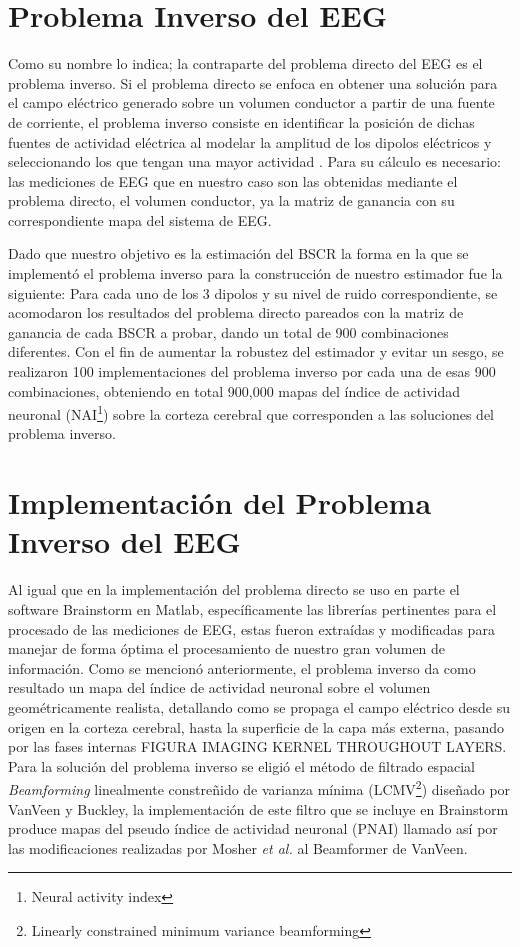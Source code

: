 \section{Problema Inverso del EEG}
\label{sec:system:inverse}

Como su nombre lo indica; la contraparte del problema directo del EEG es el problema inverso. Si el problema directo se enfoca en obtener una solución para el campo eléctrico generado sobre un volumen conductor a partir de una fuente de corriente, el problema inverso consiste en identificar la posición de dichas fuentes de actividad eléctrica al modelar la amplitud de los dipolos eléctricos y seleccionando los que tengan una mayor actividad \cite{Baillet2001}. Para su cálculo es necesario: las mediciones de EEG que en nuestro caso son las obtenidas mediante el problema directo, el volumen conductor, ya la matriz de ganancia con su correspondiente mapa del sistema de EEG.

Dado que nuestro objetivo es la estimación del BSCR la forma en la que se implementó el problema inverso para la construcción de nuestro estimador fue la siguiente: Para cada uno de los 3 dipolos y su nivel de ruido correspondiente, se acomodaron los resultados del problema directo pareados con la matriz de ganancia de cada BSCR a probar, dando un total de 900 combinaciones diferentes. Con el fin de aumentar la robustez del estimador y evitar un sesgo, se realizaron 100 implementaciones del problema inverso por cada una de esas 900 combinaciones, obteniendo en total 900,000 mapas del índice de actividad neuronal (NAI\footnote{Neural activity index}) sobre la corteza cerebral que corresponden a las soluciones del problema inverso.

\section{Implementación del Problema Inverso del EEG}

Al igual que en la implementación del problema directo se uso en parte el software Brainstorm en Matlab, específicamente las librerías pertinentes para el procesado de las mediciones de EEG, estas fueron extraídas y modificadas para manejar de forma óptima el procesamiento de nuestro gran volumen de información. Como se mencionó anteriormente, el problema inverso da como resultado un mapa del índice de actividad neuronal sobre el volumen geométricamente realista, detallando como se propaga el campo eléctrico desde su origen en la corteza cerebral, hasta la superficie de la capa más externa, pasando por las fases internas FIGURA IMAGING KERNEL THROUGHOUT LAYERS. Para la solución del problema inverso se eligió el método de filtrado espacial \emph{Beamforming} linealmente constreñido de varianza mínima (LCMV\footnote{Linearly constrained minimum variance beamforming}) diseñado por VanVeen y Buckley\cite{VanVeen1988}, la implementación de este filtro que se incluye en Brainstorm produce mapas del pseudo índice de actividad neuronal (PNAI) llamado así por las modificaciones realizadas por Mosher \emph{et al.}\cite{Jaiswal2020} al Beamformer de VanVeen.

